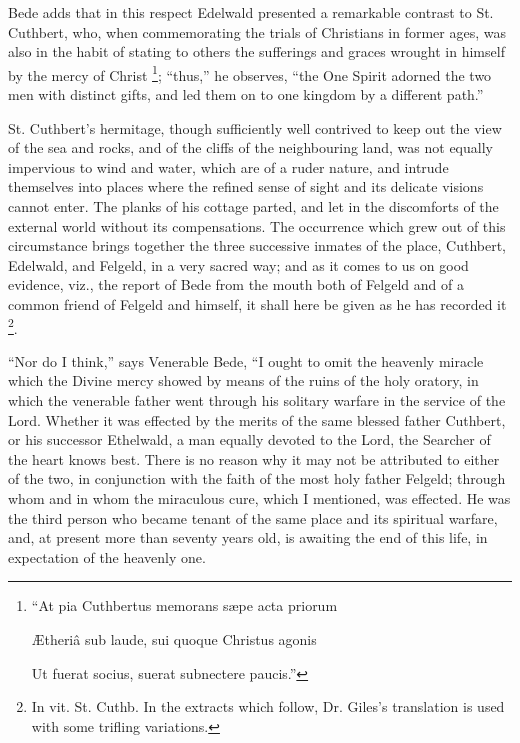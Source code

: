 Bede adds that in this respect Edelwald presented
a remarkable contrast to St. Cuthbert, who, when commemorating the
trials of Christians in former ages, was also in the habit of stating
to others the sufferings and graces wrought in himself by the mercy of
Christ \footnote{``At pia Cuthbertus memorans sæpe acta priorum

Ætheriâ
sub laude, sui quoque Christus agonis

Ut
fuerat socius, suerat subnectere paucis.''}; ``thus,'' he
observes, ``the One Spirit adorned the two men with distinct
gifts, and led them on to one kingdom by a different path.''

St. Cuthbert's hermitage, though sufficiently
well contrived to keep out the view of the sea and rocks, and of the
cliffs of the neighbouring land, was not equally impervious to wind
and water, which are of a ruder nature, and intrude themselves into
places where the refined sense of sight and its delicate visions
cannot enter. The planks of his cottage parted, and let in the
discomforts of the external world without its compensations. The
occurrence which grew out of this circumstance brings together the
three successive inmates of the place, Cuthbert, Edelwald, and Felgeld,
in a very sacred way; and as it comes to us on good evidence, viz.,
the report of Bede from the mouth both of Felgeld and of a common
friend of Felgeld and himself, it shall here be given as he has
recorded it \footnote{In vit. St. Cuthb. In the extracts which follow, Dr. Giles's
translation is used with some trifling variations.}.

``Nor do I think,'' says Venerable Bede, ``I ought
to omit the heavenly miracle which the Divine mercy showed by means of
the ruins of the holy oratory, in which the venerable father went
through his solitary warfare in the service of the Lord. Whether it
was effected by the merits of the same blessed father Cuthbert, or his
successor Ethelwald, a man equally devoted to the Lord, the Searcher
of the heart knows best. There is no reason why it may not be
attributed to either of the two, in conjunction with the faith of the
most holy father Felgeld; through whom and in whom the miraculous
cure, which I mentioned, was effected. He was the third person who
became tenant of the same place and its spiritual warfare, and, at
present more than seventy years old, is awaiting the end of this life,
in expectation of the heavenly one.

